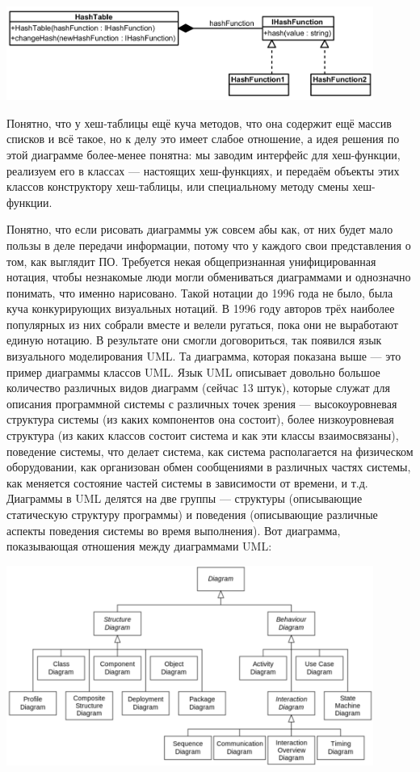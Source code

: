 \documentclass[a5paper]{article}
\begin{document}
\begin{center}
    \includegraphics[width=0.9\textwidth]{modelExample.png}
\end{center}

Понятно, что у хеш-таблицы ещё куча методов, что она содержит ещё массив списков и всё такое, но к делу это имеет слабое отношение, а идея решения по этой диаграмме более-менее понятна: мы заводим интерфейс для хеш-функции, реализуем его в классах --- настоящих хеш-функциях, и передаём объекты этих классов конструктору хеш-таблицы, или специальному методу смены хеш-функции.

Понятно, что если рисовать диаграммы уж совсем абы как, от них будет мало пользы в деле передачи информации, потому что у каждого свои представления о том, как выглядит ПО. Требуется некая общепризнанная унифицированная нотация, чтобы незнакомые люди могли обмениваться диаграммами и однозначно понимать, что именно нарисовано. Такой нотации до 1996 года не было, была куча конкурирующих визуальных нотаций. В 1996 году авторов трёх наиболее популярных из них собрали вместе и велели ругаться, пока они не выработают единую нотацию. В результате они смогли договориться, так появился язык визуального моделирования UML. Та диаграмма, которая показана выше --- это пример диаграммы классов UML. Язык UML описывает довольно большое количество различных видов диаграмм (сейчас 13 штук), которые служат для описания программной системы с различных точек зрения --- высокоуровневая структура системы (из каких компонентов она состоит), более низкоуровневая структура (из каких классов состоит система и как эти классы взаимосвязаны), поведение системы, что делает система, как система располагается на физическом оборудовании, как организован обмен сообщениями в различных частях системы, как меняется состояние частей системы в зависимости от времени, и т.д. Диаграммы в UML делятся на две группы --- структуры (описывающие статическую структуру программы) и поведения (описывающие различные аспекты поведения системы во время выполнения). Вот диаграмма, показывающая отношения между диаграммами UML:

\begin{center}
    \includegraphics[width=0.9\textwidth]{umlDiagrams.png}
\end{center}
\end{document}
